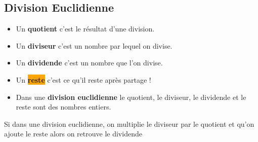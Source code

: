 
\begin{changemargin}{-10mm}{-10mm}
	\section{Division Euclidienne}
	\begin{definition}[Vocabulaire]
		\begin{itemize}
			\item Un \colorbox{red!30}{\textbf{quotient}} c'est le résultat d'une division.
			\item Un \colorbox{green!30}{\textbf{diviseur}} c'est un nombre par lequel on divise.
			\item Un \colorbox{blue!30}{\textbf{dividende}} c'est un nombre que l'on divise.
			\item Un \colorbox{orange}{\textbf{reste}} c'est ce qu'il reste après partage !
			\item Dans une \textbf{division euclidienne} le quotient, le diviseur, le dividende et le reste sont des nombres entiers.
		\end{itemize}
	\end{definition}

	\begin{propriete}[\admise]
		Si dans une division euclidienne, on multiplie le diviseur par le quotient et qu'on ajoute le reste
		alors on retrouve le dividende
	\end{propriete}

	\begin{exemples*1}
		\phantom{rrr}


\end{exemples*1}
\end{changemargin}

